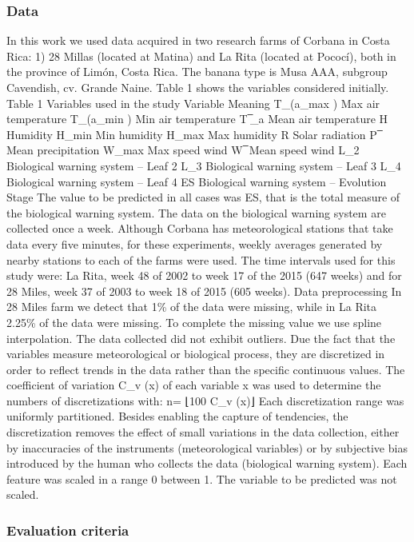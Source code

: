 \documentclass[review]{elsarticle}
\begin{document}
{{\subsubsection{Data}
In this work we used data acquired in two research farms of Corbana in Costa Rica: 1) 28 Millas (located at Matina) and La Rita (located at Pococí), both in the province of Limón, Costa Rica. The banana type is Musa AAA, subgroup Cavendish, cv. Grande Naine. Table 1 shows the variables considered initially.
Table 1 Variables used in the study
Variable	Meaning
T_(a_max )	Max air temperature
T_(a_min )	Min air temperature
T ̅_a	Mean air temperature
H	Humidity
H_min	Min humidity
H_max	Max humidity
R	Solar radiation
P ̅	Mean precipitation
W_max	Max speed wind
W ̅	Mean speed wind
L_2	Biological warning system – Leaf 2
L_3	Biological warning system – Leaf 3
L_4	Biological warning system – Leaf 4
ES	Biological warning system – Evolution Stage
The value to be predicted in all cases was ES, that is the total measure of the biological warning system.
The data on the biological warning system are collected once a week. Although Corbana has meteorological stations that take data every five minutes, for these experiments, weekly averages generated by nearby stations to each of the farms were used.
The time intervals used for this study were: La Rita, week 48 of 2002 to week 17 of the 2015 (647 weeks) and for 28 Miles, week 37 of 2003 to week 18 of 2015 (605 weeks).
Data preprocessing
In 28 Miles farm we detect that 1\% of the data were missing, while in La Rita 2.25\% of the data were missing. To complete the missing value we use spline interpolation. The data collected did not exhibit outliers.
Due the fact that the variables measure meteorological or biological process, they are discretized in order to reflect trends in the data rather than the specific continuous values. The coefficient of variation C_v (x) of each variable x was used to determine the numbers of discretizations with:
n= ⌊100 C_v (x)⌋
Each discretization range was uniformly partitioned. Besides enabling the capture of tendencies, the discretization removes the effect of small variations in the data collection, either by inaccuracies of the instruments (meteorological variables) or by subjective bias introduced by the human who collects the data (biological warning system).
Each feature was scaled in a range 0 between 1. The variable to be predicted was not scaled.

\subsubsection{Evaluation criteria}

}}
\end{document}
